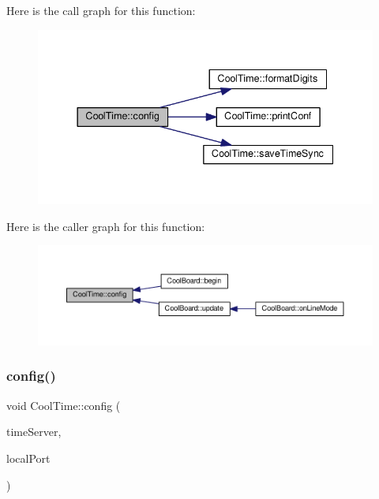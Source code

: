 Here is the call graph for this function\+:
\nopagebreak
\begin{figure}[H]
\begin{center}
\leavevmode
\includegraphics[width=337pt]{classCoolTime_a87c28260c1bc77091162cbcf1ee2e129_cgraph}
\end{center}
\end{figure}
Here is the caller graph for this function\+:
\nopagebreak
\begin{figure}[H]
\begin{center}
\leavevmode
\includegraphics[width=350pt]{classCoolTime_a87c28260c1bc77091162cbcf1ee2e129_icgraph}
\end{center}
\end{figure}
\mbox{\label{classCoolTime_a014656d0d3f74d6391364b92b13e0780}} 
\subsubsection{\texorpdfstring{config()}{config()}\hspace{0.1cm}{\footnotesize\ttfamily [2/2]}}
{\footnotesize\ttfamily void Cool\+Time\+::config (\begin{DoxyParamCaption}\item[{I\+P\+Address}]{time\+Server,  }\item[{unsigned int}]{local\+Port }\end{DoxyParamCaption})}

